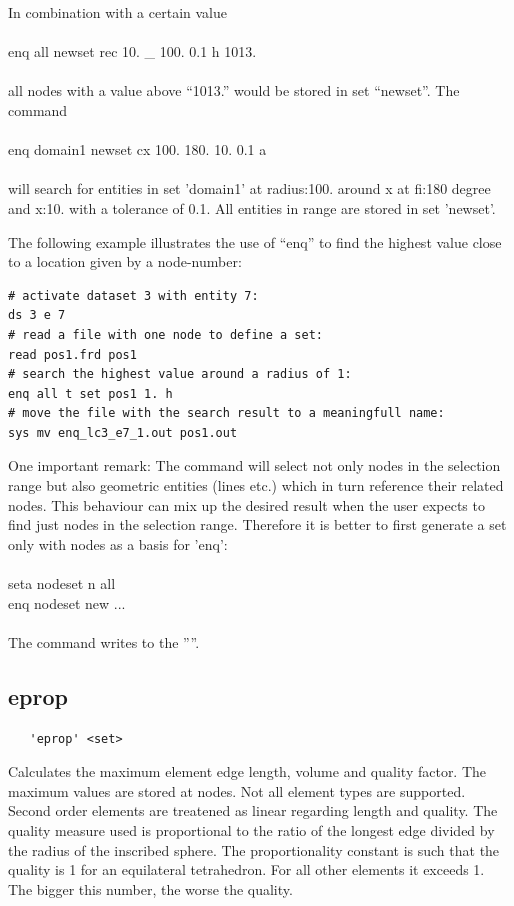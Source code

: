 \documentclass{article}
\begin{document}
In combination with a certain value\\\\
enq all newset rec 10. \_ 100. 0.1 h 1013.\\\\all nodes with a value above ``1013.'' would be stored in set ``newset''. The command \\\\
enq domain1 newset cx 100. 180. 10. 0.1 a\\\\
will search for entities in set 'domain1' at radius:100. around x at fi:180 degree and x:10. with a tolerance of 0.1. All entities in range are stored in set 'newset'.

The following example illustrates the use of ``enq'' to find the highest value close to a location given by a node-number: 
\begin{verbatim}
# activate dataset 3 with entity 7:
ds 3 e 7
# read a file with one node to define a set:
read pos1.frd pos1
# search the highest value around a radius of 1:
enq all t set pos1 1. h
# move the file with the search result to a meaningfull name:
sys mv enq_lc3_e7_1.out pos1.out
\end{verbatim}

One important remark:
The command will select not only nodes in the selection range but also geometric entities (lines etc.) which in turn reference their related nodes. This behaviour can mix up the desired result when the user expects to find just nodes in the selection range. Therefore it is better to first generate a set only with nodes as a basis for 'enq':\\\\
seta nodeset n all\\
enq nodeset new ...\\\\
The command writes to the ''''.


\subsection{\label{eprop}eprop}
\begin{verbatim}
   'eprop' <set>
\end{verbatim}
Calculates the maximum element edge length, volume and quality factor. The maximum values are stored at nodes. Not all element types are supported. Second order elements are treatened as linear regarding length and quality. The quality measure used is proportional to the ratio of the longest edge divided by the radius of the inscribed sphere. The proportionality constant is such that the quality is 1 for an equilateral tetrahedron. For all other elements it exceeds 1. The bigger this number, the worse the quality.
\end{document}
